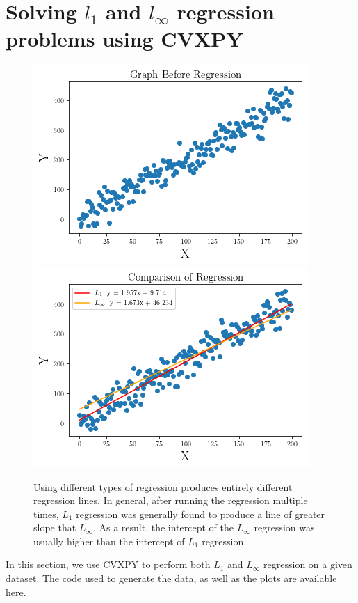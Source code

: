 \documentclass{article}
\begin{document}
\section*{Solving $l_1$ and $l_\infty $ regression problems using CVXPY}

\begin{figure}[h]
\centering
\includegraphics[scale = 0.6]{Line.png}
\includegraphics[scale = 0.6]{Comparison.png}
\caption{Using different types of regression produces entirely different regression lines. In general, after running the regression multiple times, $L_1$ regression was generally found to produce a line of greater slope that $L_\infty$. As a result, the intercept of the $L_\infty$ regression was usually higher than the intercept of $L_1$ regression.}
\end{figure}
In this section, we use CVXPY to perform both $L_1$ and $L_\infty$ regression on a given dataset. The code used to generate the data, as well as the plots are available \href{https://github.com/thetruejacob/CS166/blob/master/Network%20Simulation%20Assignment/Network%20Simulation.ipynb}{here}.
\end{document}
